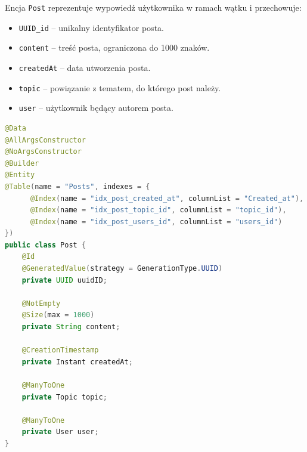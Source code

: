 \noindent Encja \texttt{Post} reprezentuje wypowiedź użytkownika w ramach wątku i przechowuje:
\begin{itemize}
    \item \texttt{UUID\_id} -- unikalny identyfikator posta.
    \item \texttt{content} -- treść posta, ograniczona do 1000 znaków.
    \item \texttt{createdAt} -- data utworzenia posta.
    \item \texttt{topic} -- powiązanie z tematem, do którego post należy.
    \item \texttt{user} -- użytkownik będący autorem posta.
\end{itemize}

\begin{lstlisting}[language=Java, style=JavaStyle, caption=Encja \texttt{Post}]
@Data
@AllArgsConstructor
@NoArgsConstructor
@Builder
@Entity
@Table(name = "Posts", indexes = {
      @Index(name = "idx_post_created_at", columnList = "Created_at"),
      @Index(name = "idx_post_topic_id", columnList = "topic_id"),
      @Index(name = "idx_post_users_id", columnList = "users_id")
})
public class Post {
    @Id
    @GeneratedValue(strategy = GenerationType.UUID)
    private UUID uuidID;

    @NotEmpty
    @Size(max = 1000)
    private String content;

    @CreationTimestamp
    private Instant createdAt;

    @ManyToOne
    private Topic topic;

    @ManyToOne
    private User user;
}
\end{lstlisting}

